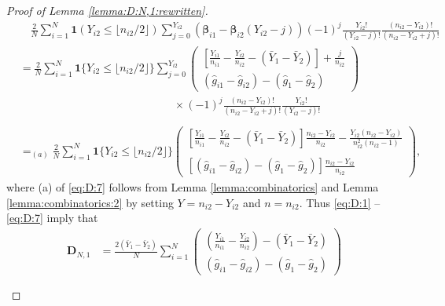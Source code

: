 \documentclass[10pt,a4paper]{amsart}
\begin{document}
\begin{proof}[Proof of Lemma \ref{lemma:D:N,1:rewritten}]
\begin{equation}\label{eq:D:7}
\begin{array}{rl}
&\quad\displaystyle\frac{2}{N}\sum_{i=1}^N\mathbf{1}(Y_{i2}\leq \lfloor n_{i2}/2\rfloor)\sum_{j=0}^{Y_{i2}}(\boldsymbol{\beta}_{i1}-\boldsymbol{\beta}_{i2}(Y_{i2}-j))(-1)^{j}\frac{Y_{i2}!}{(Y_{i2}-j)!}\frac{(n_{i2} - Y_{i2})!}{(n_{i2}-Y_{i2}+j)!}\\
&\displaystyle=\frac{2}{N}\sum_{i=1}^N\mathbf{1}\{Y_{i2}\leq \lfloor n_{i2}/2\rfloor\}\sum_{j=0}^{Y_{i2}}\begin{pmatrix}
\displaystyle\left[\frac{Y_{i1}}{n_{i1}}-\frac{Y_{i2}}{n_{i2}}-(\bar{Y}_1-\bar{Y}_2)\right]+\frac{j}{n_{i2}}\\
(\hat{g}_{i1}-\hat{g}_{i2})-(\hat{g}_1-\hat{g}_2)
\end{pmatrix}\\
&\quad\quad\quad\quad\quad\quad\quad\quad\quad\quad\quad\quad\quad\quad\displaystyle\times(-1)^{j}\frac{(n_{i2}-Y_{i2})!}{(n_{i2}-Y_{i2}+j)!}\frac{Y_{i2}!}{(Y_{i2}-j)!}\\
\\
&\displaystyle=_{(a)}\frac{2}{N}\sum_{i=1}^N\mathbf{1}\{Y_{i2}\leq \lfloor n_{i2}/2\rfloor\}\begin{pmatrix}
\displaystyle\left[\frac{Y_{i1}}{n_{i1}}-\frac{Y_{i2}}{n_{i2}}-(\bar{Y}_1-\bar{Y}_2)\right]\frac{n_{i2}-Y_{i2}}{n_{i2}}-\frac{Y_{i2}(n_{i2}-Y_{i2})}{n_{i2}^2(n_{i2}-1)}\\
\\
\displaystyle[(\hat{g}_{i1}-\hat{g}_{i2})-(\hat{g}_1-\hat{g}_2)]\frac{n_{i2}-Y_{i2}}{n_{i2}}
\end{pmatrix},
\end{array}
\end{equation}
where (a) of \eqref{eq:D:7} follows from Lemma \ref{lemma:combinatorics} and Lemma \ref{lemma:combinatorics:2} by setting $Y=n_{i2}-Y_{i2}$ and $n=n_{i2}$. 
Thus \eqref{eq:D:1} -- \eqref{eq:D:7} imply that 
\begin{equation}\label{eq:D:N,1:expand}
\begin{array}{rl}
\mathbf{D}_{N,1}\!\!\!\!&\displaystyle=\frac{2(\bar{Y}_1-\bar{Y}_2)}{N}\sum_{i=1}^N\begin{pmatrix}
\displaystyle\left(\frac{Y_{i1}}{n_{i1}}-\frac{Y_{i2}}{n_{i2}}\right)-(\bar{Y}_1-\bar{Y}_2)\\
\displaystyle(\hat{g}_{i1}-\hat{g}_{i2})-(\hat{g}_1-\hat{g}_2)
\end{pmatrix}\\
\\

\end{array}
\end{equation}
\end{proof}
\end{document}
